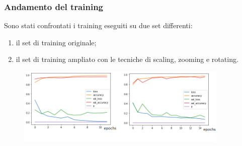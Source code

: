 \documentclass{beamer}
\begin{document}
\begin{frame}
	\frametitle{Andamento del training}
	Sono stati confrontati i training eseguiti su due set differenti:
	\begin{enumerate}
		\item il set di training originale;
		\item il set di training ampliato con le tecniche di scaling, zooming e rotating.
	\end{enumerate}

	\begin{figure}
		\includegraphics[width=0.9\textwidth]{history-pneumonia-no-aug.png}
	\end{figure}

	
\end{frame}

	
\end{document}
